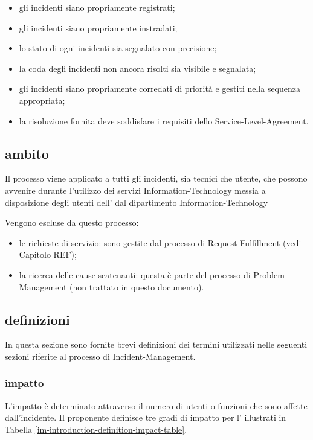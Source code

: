 \begin{itemize}
\item{gli incidenti siano propriamente registrati;}
\item{gli incidenti siano propriamente instradati;}
\item{lo stato di ogni incidenti sia segnalato con precisione;}
\item{la coda degli incidenti non ancora risolti sia visibile e segnalata;}
\item{gli incidenti siano propriamente corredati di priorità e gestiti nella sequenza appropriata;}
\item{la risoluzione fornita deve soddisfare i requisiti dello \ac{Service-Level-Agreement}.}
\end{itemize}

\subsection[Ambito]{ambito}
\label{im-introduction-scope}
Il processo viene applicato a tutti gli incidenti, sia tecnici che utente, che possono avvenire durante l'utilizzo dei servizi \acs{Information-Technology} messia a disposizione degli utenti dell'\entity{} dal dipartimento \acs{Information-Technology}

Vengono escluse da questo processo:

\begin{itemize}
\item{le richieste di servizio: sono gestite dal processo di \ac{Request-Fulfillment} (vedi Capitolo REF);}
\item{la ricerca delle cause scatenanti: questa è parte del processo di \ac{Problem-Management} (non trattato in questo documento).}
\end{itemize}

\subsection[Definizioni]{definizioni}
\label{im-introduction-definitions}
In questa sezione sono fornite brevi definizioni dei termini utilizzati nelle seguenti sezioni riferite al processo di \ac{Incident-Management}.

\subsubsection{impatto}
L'impatto è determinato attraverso il numero di utenti o funzioni che sono affette dall'incidente. Il proponente definisce tre gradi di impatto per l'\entity{} illustrati in Tabella \ref{im-introduction-definition-impact-table}.

